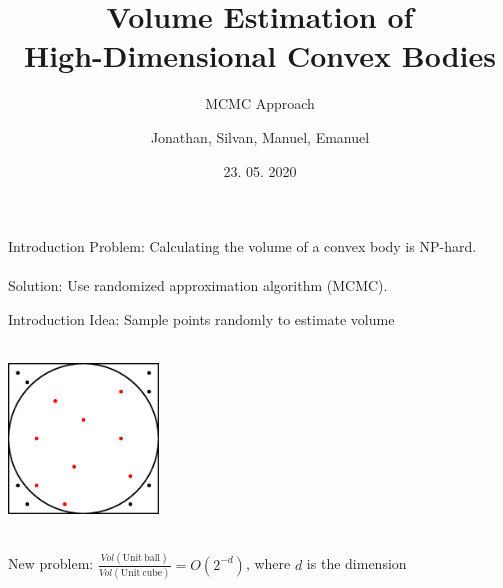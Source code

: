 \documentclass[table]{beamer}
\title{Volume Estimation of \\High-Dimensional Convex Bodies}
\subtitle{MCMC Approach}
\author{Jonathan, Silvan, Manuel, Emanuel}
\date{23. 05. 2020}
\begin{document}

\begin{frame}
	\maketitle %
\end{frame}






\begin{frame}{Introduction}
    Problem: Calculating the volume of a convex body is NP-hard.\\
    \ \\
    Solution: Use randomized approximation algorithm (MCMC).
\end{frame}

\begin{frame}{Introduction}
    Idea: Sample points randomly to estimate volume\\
    \ \\
    \begin{center}
        \includegraphics[width=40mm]{basic_sampling.eps}
    \end{center}
    \ \\
    New problem: $\frac{Vol(\mathrm{Unit\ ball})}{Vol(\mathrm{Unit\ cube})} = O(2^{-d})$, where $d$ is the dimension
\end{frame}
\end{document}
